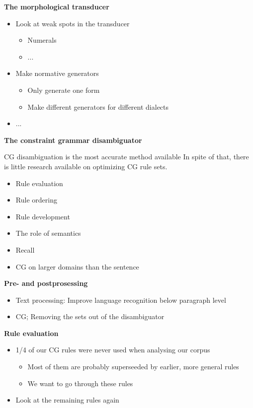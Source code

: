 \documentclass[landscape,english,11pt]{seminar}
\begin{document}
\begin{slide}
\newslide
\textbf{The morphological transducer}
\begin{itemize}
\item Look at weak spots in the transducer
\begin{itemize}
\item Numerals
\item ...
\end{itemize}
\item Make normative generators
\begin{itemize}
\item Only generate one form
\item Make different generators for different dialects
\end{itemize}
\item ...
\end{itemize}


\newslide
\textbf{The constraint grammar disambiguator}

CG disambiguation is the most accurate method available In spite of that, there is little research available on optimizing CG rule sets.

\begin{itemize}
\item Rule evaluation
\item Rule ordering
\item Rule development
\item The role of semantics
\item Recall
\item CG on larger domains than the sentence
\end{itemize}


\newslide
\textbf{Pre- and postprosessing}
\begin{itemize}
\item Text processing: Improve language recognition below paragraph level
\item CG; Removing the sets out of the disambiguator
\end{itemize}

\newslide
\textbf{Rule evaluation}
\begin{itemize}
\item 1/4 of our CG rules were never used when analysing our corpus
\begin{itemize}
\item Most of them are probably superseeded by earlier, more general rules
\item We want to go through these rules
\end{itemize}
\item Look at the remaining rules again
\end{itemize}


\end{slide}
\end{document}

